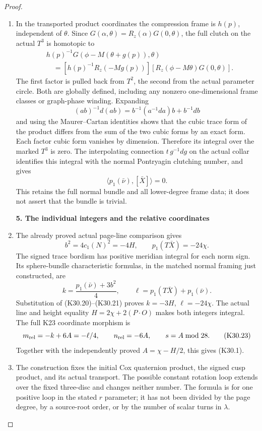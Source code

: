 \begin{proof}
\begin{enumerate}[label=\arabic*.]
\item In the transported product coordinates the compression
frame is \(h(p)\), independent of \(\theta\). Since
\(G(\alpha,\theta)=R_z(\alpha)G(0,\theta)\), the full
clutch on the actual \(T^3\) is homotopic to
\[
 \begin{split}
 &h(p)^{-1}G(\phi-M(\theta+g(p)),\theta)\\
 &\quad=
  [h(p)^{-1}R_z(-Mg(p))]
  [R_z(\phi-M\theta)G(0,\theta)] .
 \end{split}
 \tag{K30.19}
\]
The first factor is pulled back from \(T^2\), the second
from the actual parameter circle. Both are globally
defined, including any nonzero one-dimensional frame
classes or graph-phase winding. Expanding
\[
 (ab)^{-1}d(ab)=b^{-1}(a^{-1}da)b+b^{-1}db
\]
and using the Maurer--Cartan identities shows that the
cubic trace form of the product differs from the sum of
the two cubic forms by an exact form. Each factor cubic
form vanishes by dimension. Therefore its integral over
the marked \(T^3\) is zero. The interpolating connection
\(t\,g^{-1}dg\) on the actual collar identifies this integral
with the normal Pontryagin clutching number, and gives
\[
                    \langle p_1(\bar\nu),[\bar X]\rangle=0.
 \tag{K30.20}
\]
This retains the full normal bundle and all lower-degree
frame data; it does not assert that the bundle is trivial.

\par

\medskip\noindent\textbf{5. The individual integers and the relative coordinates}

\par\nobreak

\item The already proved actual page-line comparison gives
\[
 b^2=4c_1(N)^2=-4H,\qquad
 p_1(T\bar X)=-24\chi .
 \tag{K30.21}
\]
The signed trace bordism has positive meridian integral
for each norm sign. Its sphere-bundle characteristic
formulas, in the matched normal framing just constructed,
are
\[
 k=\frac{p_1(\bar\nu)+3b^2}{4},\qquad
 \ell=p_1(T\bar X)+p_1(\bar\nu).
 \tag{K30.22}
\]
Substitution of (K30.20)--(K30.21) proves
\(k=-3H\), \(\ell=-24\chi\).
The actual line and height equality
\(H=2\chi+2(P\cdot O)\) makes both integers integral.
The full K23 coordinate morphism is
\[
 m_{\rm rel}=-k+6A=-\ell/4,\qquad
 n_{\rm rel}=-6A,\qquad s=A\bmod28 .
 \tag{K30.23}
\]
Together with the independently proved
\(A=\chi-H/2\), this gives (K30.1).

\item The construction fixes the initial Cox quaternion product,
the signed cusp product, and its actual transport. The
possible constant rotation loop extends over the fixed
three-disc and changes neither number. The formula is for
one positive loop in the stated \(r\) parameter; it has not
been divided by the page degree, by a source-root order,
or by the number of scalar turns in \(\lambda\).


\end{enumerate}
\end{proof}
